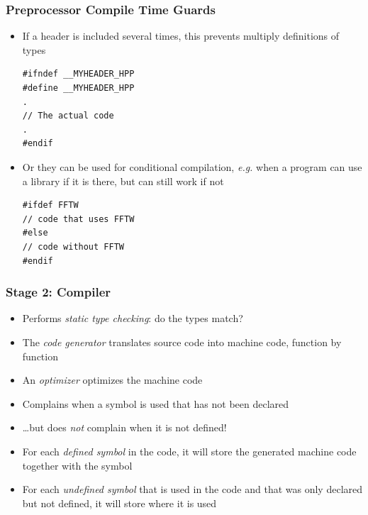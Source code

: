 \documentclass{slides}
\newcommand{\eg}{\textit{e.\thinspace g.}\xspace}
\begin{document}
\begin{frame}[fragile]
  \frametitle{Preprocessor Compile Time Guards}
    \begin{itemize}
    \item If a header is included several times, this prevents
      multiply definitions of types
      \begin{lstlisting}
#ifndef __MYHEADER_HPP
#define __MYHEADER_HPP
.
// The actual code
.
#endif          
      \end{lstlisting}
    \item Or they can be used for conditional compilation, \eg when a
      program can use a library if it is there, but can still work
      if not
      \begin{lstlisting}
#ifdef FFTW
// code that uses FFTW
#else
// code without FFTW
#endif        
      \end{lstlisting}
    \end{itemize}
\end{frame}

\begin{frame}[fragile]
  \frametitle{Stage 2: Compiler}

  \begin{itemize}
  \item Performs \emph{static type checking}: do the types match?
  \item The \emph{code generator} translates source code into machine
    code, function by function
  \item An \emph{optimizer} optimizes the machine code
  \item Complains when a symbol is used that has not been declared
  \item \dots but does \emph{not} complain when it is not defined!
  \item For each \emph{defined symbol} in the code, it will store the
    generated machine code together with the symbol
  \item For each \emph{undefined symbol} that is used in the code and
    that was only declared but not defined, it will store where it is
    used
  \end{itemize}
\end{frame}
\end{document}
